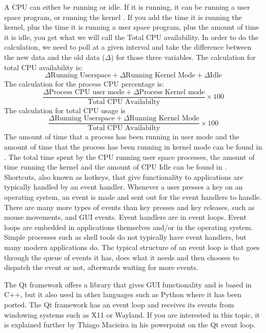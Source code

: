 \documentclass[12pt]{article}
\begin{document}
A CPU can either be running or idle.
If it is running, it can be running a user space program, or running the kernel \cite{scoutBlog}.
If you add the time it is running the kernel, plus the time it is running a user space program, plus the amount of time it is idle, you get what we will call the Total CPU availability.
In order to do the calculation, we need to poll at a given interval and take the difference between the new data and the old data ($\Delta$) for those three variables. The calculation for total CPU availability is:\\
$$ \Delta\text{Running Userspace} + \Delta\text{Running Kernel Mode} + \Delta\text{Idle}$$
The calculation for the process CPU percentage is:\\
$$ \frac{\Delta\text{Process CPU user mode} + \Delta\text{Process Kernel mode}}{\text{Total CPU Availabilty}} \times 100 $$
The calculation for total CPU usage is\\
$$ \frac{\Delta\text{Running Userspace} + \Delta\text{Running Kernel Mode}}{\text{Total CPU Availabilty}} \times 100 $$
The amount of time that a process has been running in user mode and the amount of time that the process has been running in kernel mode can be found in . \cite{manProc}
The total time spent by the CPU running user space processes, the amount of time running the kernel and the amount of CPU Idle can be found in  \cite{manProc}.\\
	
	
Shortcuts, also known as hotkeys, that give functionality to applications are typically handled by an event handler.
Whenever a user presses a key on an operating system, an event is made and sent out for the event handlers to handle.
There are many more types of events than key presses and key releases, such as mouse movements, and GUI events.
Event handlers are in event loops. Event loops are embedded in applications themselves and/or in the operating system. Simple processes such as shell tools do not typically have event handlers, but many modern applications do. The typical structure of an event loop is that goes through the queue of events it has, does what it needs and then chooses to dispatch the event or not, afterwards waiting for more events. 

The Qt framework offers a library that gives GUI functionality and is based in C++, but it also used in other languages such as Python where it has been ported.
The Qt framework has an event loop and receives its events from windowing systems such as X11 or Wayland.
If you are interested in this topic, it is explained further by Thiago Macieira in his powerpoint on the Qt event loop\cite{QtSlides}.
\end{document}
